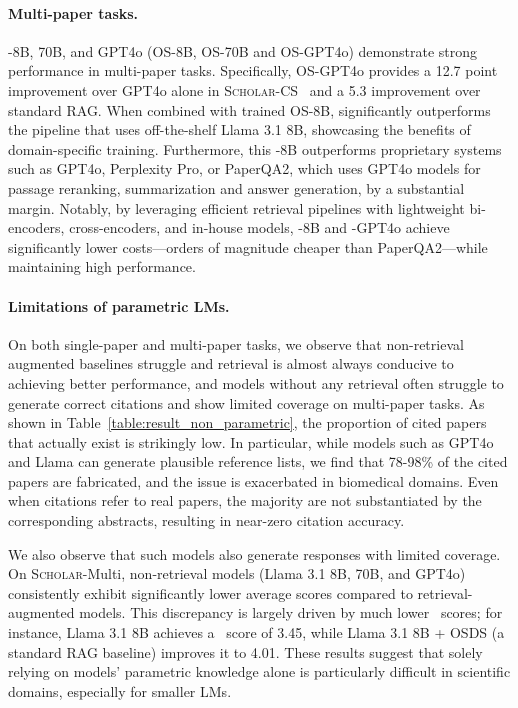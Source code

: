\paragraph{Multi-paper tasks.} 
\model-8B, 70B, and GPT4o (OS-8B, OS-70B and OS-GPT4o) demonstrate strong performance in multi-paper tasks. Specifically, OS-GPT4o provides a 12.7 point improvement over GPT4o alone in \textsc{Scholar-CS} \acc~and a 5.3 improvement over standard RAG. 
When combined with trained OS-8B, \model significantly outperforms the pipeline that uses off-the-shelf Llama 3.1 8B, showcasing the benefits of domain-specific training. 
Furthermore, this \model-8B outperforms proprietary systems such as GPT4o, Perplexity Pro, or PaperQA2, which uses GPT4o models for passage reranking, summarization and answer generation, by a substantial margin. 
Notably, by leveraging efficient retrieval pipelines with lightweight bi-encoders, cross-encoders, and in-house models, \model-8B and \model-GPT4o achieve significantly lower costs—orders of magnitude cheaper than PaperQA2---while maintaining high performance.  

\paragraph{Limitations of parametric LMs.}
On both single-paper and multi-paper tasks, we observe that non-retrieval augmented baselines struggle and retrieval is almost always conducive to achieving better performance, and models without any retrieval often struggle to generate correct citations and show limited coverage on multi-paper tasks. 
As shown in Table~\ref{table:result_non_parametric}, the proportion of cited papers that actually exist is strikingly low. In particular, while models such as GPT4o and Llama can generate plausible reference lists, we find that 78-98\% of the cited papers are fabricated, and the issue is exacerbated in biomedical domains. Even when citations refer to real papers, the majority are not substantiated by the corresponding abstracts, resulting in near-zero citation accuracy. 

We also observe that such models also generate responses with limited coverage. 
On \textsc{Scholar}-Multi, non-retrieval models (Llama 3.1 8B, 70B, and GPT4o) consistently exhibit significantly lower average scores compared to retrieval-augmented models. This discrepancy is largely driven by much lower \cov~scores; for instance, Llama 3.1 8B achieves a \cov~score of 3.45, while Llama 3.1 8B + OSDS (a standard RAG baseline) improves it to 4.01. 
These results suggest that solely relying on models' parametric knowledge alone is particularly difficult in scientific domains, especially for smaller LMs. 

